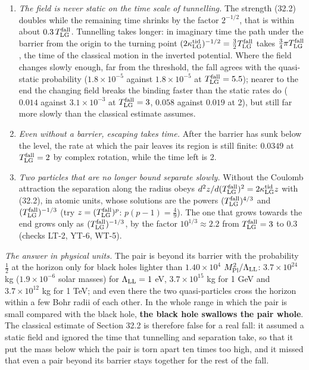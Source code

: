 \documentclass[
  10pt,
]{article}
\providecommand{\tightlist}{%
  \setlength{\itemsep}{0pt}\setlength{\parskip}{0pt}}
\begin{document}
\begin{enumerate}
\def\labelenumi{\arabic{enumi}.}
\tightlist
\item
  \emph{The field is never static on the time scale of tunnelling.} The
  strength (32.2) doubles while the remaining time shrinks by the factor
  \(2^{-1/2}\), that is within about \(0.3\,T^{\rm fall}_{\rm LG}\).
  Tunnelling takes longer: in imaginary time the path under the barrier
  from the origin to the turning point
  \((2\kappa^{\rm tid}_{\rm LG})^{-1/2}=\tfrac32T^{\rm fall}_{\rm LG}\)
  takes \(\tfrac34\pi T^{\rm fall}_{\rm LG}\), the time of the classical
  motion in the inverted potential. Where the field changes slowly
  enough, far from the threshold, the fall agrees with the quasi-static
  probability (\(1.8\times10^{-5}\) against \(1.8\times10^{-5}\) at
  \(T^{\rm fall}_{\rm LG}=5.5\)); nearer to the end the changing field
  breaks the binding faster than the static rates do (\(0.014\) against
  \(3.1\times10^{-3}\) at \(T^{\rm fall}_{\rm LG}=3\), \(0.058\) against
  \(0.019\) at 2), but still far more slowly than the classical estimate
  assumes.
\item
  \emph{Even without a barrier, escaping takes time.} After the barrier
  has sunk below the level, the rate at which the pair leaves its region
  is still finite: \(0.0349\) at \(T^{\rm fall}_{\rm LG}=2\) by complex
  rotation, while the time left is 2.
\item
  \emph{Two particles that are no longer bound separate slowly.} Without
  the Coulomb attraction the separation along the radius obeys
  \(d^2z/d(T^{\rm fall}_{\rm LG})^2=2\kappa^{\rm tid}_{\rm LG}z\) with
  (32.2), in atomic units, whose solutions are the powers
  \((T^{\rm fall}_{\rm LG})^{4/3}\) and
  \((T^{\rm fall}_{\rm LG})^{-1/3}\) (try
  \(z=(T^{\rm fall}_{\rm LG})^p\): \(p(p-1)=\tfrac49\)). The one that
  grows towards the end grows only as
  \((T^{\rm fall}_{\rm LG})^{-1/3}\), by the factor
  \(10^{1/3}\approx2.2\) from \(T^{\rm fall}_{\rm LG}=3\) to 0.3 (checks
  LT-2, YT-6, WT-5).
\end{enumerate}

\emph{The answer in physical units.} The pair is beyond its barrier with
the probability \(\tfrac12\) at the horizon only for black holes lighter
than \(1.40\times10^{4}\) \(M_{\rm Pl}^2/\Lambda_{\rm LL}\):
\(3.7\times10^{24}\) kg (\(1.9\times10^{-6}\) solar masses) for
\(\Lambda_{\rm LL}=1\) eV, \(3.7\times10^{15}\) kg for 1 GeV and
\(3.7\times10^{12}\) kg for 1 TeV; and even there the two
quasi-particles cross the horizon within a few Bohr radii of each other.
In the whole range in which the pair is small compared with the black
hole, \textbf{the black hole swallows the pair whole}. The classical
estimate of Section 32.2 is therefore false for a real fall: it assumed
a static field and ignored the time that tunnelling and separation take,
so that it put the mass below which the pair is torn apart ten times too
high, and it missed that even a pair beyond its barrier stays together
for the rest of the fall.
\end{document}
